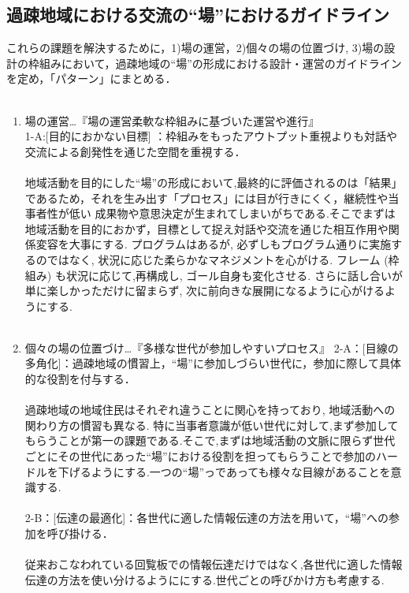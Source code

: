 \documentclass[a4paper]{jsarticle}
\begin{document}
\subsection{過疎地域における交流の“場”におけるガイドライン}

これらの課題を解決するために，1)場の運営，2)個々の場の位置づけ, 3)場の設計の枠組みにおいて，過疎地域の“場”の形成における設計・運営のガイドラインを定め，「パターン」にまとめる．\\\\
\begin{enumerate}
\item 場の運営…『場の運営柔軟な枠組みに基づいた運営や進行』\\
1-A:[目的におかない目標] ：枠組みをもったアウトプット重視よりも対話や交流による創発性を通じた空間を重視する．\\\\
地域活動を目的にした“場”の形成において,最終的に評価されるのは「結果」であるため，それを生み出す「プロセス」には目が行きにくく，継続性や当事者性が低い
成果物や意思決定が生まれてしまいがちである.そこでまずは地域活動を目的におかず，目標として捉え対話や交流を通じた相互作用や関係変容を大事にする. プログラムはあるが, 必ずしもプログラム通りに実施するのではなく, 状況に応じた柔らかなマネジメントを心がける. フレーム (枠組み) も状況に応じて,再構成し, ゴール自身も変化させる. さらに話し合いが単に楽しかっただけに留まらず, 次に前向きな展開になるように心がけるようにする.\\\\

\item 個々の場の位置づけ…『多様な世代が参加しやすいプロセス』
2-A：[目線の多角化]：過疎地域の慣習上，“場”に参加しづらい世代に，参加に際して具体的な役割を付与する．\\\\
過疎地域の地域住民はそれぞれ違うことに関心を持っており, 地域活動への関わり方の慣習も異なる. 特に当事者意識が低い世代に対して,まず参加してもらうことが第一の課題である.そこで,まずは地域活動の文脈に限らず世代ごとにその世代にあった“場”における役割を担ってもらうことで参加のハードルを下げるようにする.一つの“場”っであっても様々な目線があることを意識する.\\\\

2-B：[伝達の最適化]：各世代に適した情報伝達の方法を用いて，“場”への参加を呼び掛ける．\\\\
従来おこなわれている回覧板での情報伝達だけではなく,各世代に適した情報伝達の方法を使い分けるようににする.世代ごとの呼びかけ方も考慮する.\\\\



\end{enumerate}
\end{document}
